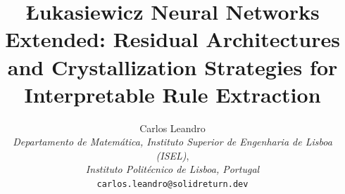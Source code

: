 \documentclass[10pt,a4paper,twoside]{article}
\begin{document}
\title{\L{}ukasiewicz Neural Networks Extended: Residual Architectures and
       Crystallization Strategies for Interpretable Rule Extraction}

\author{Carlos Leandro\\
  \textit{Departamento de Matem\'atica,
  Instituto Superior de Engenharia de Lisboa (ISEL)},\\
  \textit{Instituto Polit\'ecnico de Lisboa, Portugal}\\
  \texttt{carlos.leandro@solidreturn.dev}}

\date{}
\maketitle

\end{document}
